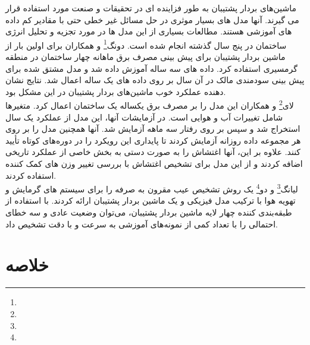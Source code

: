 ماشین‌های بردار پشتیبان به طور فزاینده ای در تحقیقات و صنعت مورد استفاده قرار می گیرند. آنها مدل های بسیار موثری در حل مسائل غیر خطی حتی با مقادیر کم داده های آموزشی هستند. مطالعات بسیاری از این مدل ها در مورد تجزیه و تحلیل انرژی ساختمان در پنج سال گذشته انجام شده است.
دونگ\footnote{} و همکاران \cite{dong2005applying} برای اولین بار از ماشین بردار پشتیبان برای پیش بینی مصرف برق ماهانه چهار ساختمان در منطقه گرمسیری استفاده کرد. داده های سه ساله آموزش داده شد و مدل مشتق شده برای پیش بینی سودمندی مالک در آن سال بر روی داده های یک ساله اعمال شد. نتایج نشان دهنده عملکرد خوب ماشین‌های بردار پشتیبان در این مشکل بود.
\\
لای\footnote{} و همکاران\cite{lai2008vapnik} این مدل را بر مصرف برق یکساله یک ساختمان اعمال کرد. متغیرها شامل تغییرات آب و هوایی است. در آزمایشات آنها، این مدل از عملکرد یک سال استخراج شد و سپس بر روی رفتار سه ماهه آزمایش شد. آنها همچنین مدل را بر روی هر مجموعه داده روزانه آزمایش کردند تا پایداری این رویکرد را در دوره‌های کوتاه تأیید کنند. علاوه بر این، آنها اغتشاش را به صورت دستی به بخش خاصی از عملکرد تاریخی اضافه کردند و از این مدل برای تشخیص اغتشاش با بررسی تغییر وزن های کمک کننده استفاده کردند.
\\
لیانگ\footnote{} و دو\footnote{} \cite{liang2007model} یک روش تشخیص عیب مقرون به صرفه را برای سیستم های گرمایش و تهویه هوا با ترکیب مدل فیزیکی و یک ماشین بردار پشتیبان ارائه کردند. با استفاده از طبقه‌بندی کننده چهار لایه ماشین بردار پشتیبان، می‌توان وضعیت عادی و سه خطای احتمالی را با تعداد کمی از نمونه‌های آموزشی به سرعت و با دقت تشخیص داد.


\section{خلاصه}

